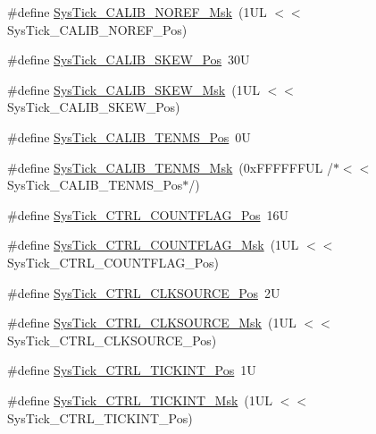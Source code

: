\begin{DoxyCompactItemize}
\item 
\#define \hyperlink{group___c_m_s_i_s___sys_tick_ga3af0d891fdd99bcc8d8912d37830edb6}{Sys\+Tick\+\_\+\+C\+A\+L\+I\+B\+\_\+\+N\+O\+R\+E\+F\+\_\+\+Msk}~(1\+U\+L $<$$<$ Sys\+Tick\+\_\+\+C\+A\+L\+I\+B\+\_\+\+N\+O\+R\+E\+F\+\_\+\+Pos)
\item 
\#define \hyperlink{group___c_m_s_i_s___sys_tick_gadd0c9cd6641b9f6a0c618e7982954860}{Sys\+Tick\+\_\+\+C\+A\+L\+I\+B\+\_\+\+S\+K\+E\+W\+\_\+\+Pos}~30U
\item 
\#define \hyperlink{group___c_m_s_i_s___sys_tick_ga8a6a85a87334776f33d77fd147587431}{Sys\+Tick\+\_\+\+C\+A\+L\+I\+B\+\_\+\+S\+K\+E\+W\+\_\+\+Msk}~(1\+U\+L $<$$<$ Sys\+Tick\+\_\+\+C\+A\+L\+I\+B\+\_\+\+S\+K\+E\+W\+\_\+\+Pos)
\item 
\#define \hyperlink{group___c_m_s_i_s___sys_tick_gacae558f6e75a0bed5d826f606d8e695e}{Sys\+Tick\+\_\+\+C\+A\+L\+I\+B\+\_\+\+T\+E\+N\+M\+S\+\_\+\+Pos}~0U
\item 
\#define \hyperlink{group___c_m_s_i_s___sys_tick_gaf1e68865c5aece2ad58971225bd3e95e}{Sys\+Tick\+\_\+\+C\+A\+L\+I\+B\+\_\+\+T\+E\+N\+M\+S\+\_\+\+Msk}~(0x\+F\+F\+F\+F\+F\+F\+U\+L /$\ast$$<$$<$ Sys\+Tick\+\_\+\+C\+A\+L\+I\+B\+\_\+\+T\+E\+N\+M\+S\+\_\+\+Pos$\ast$/)
\item 
\#define \hyperlink{group___c_m_s_i_s___sys_tick_gadbb65d4a815759649db41df216ed4d60}{Sys\+Tick\+\_\+\+C\+T\+R\+L\+\_\+\+C\+O\+U\+N\+T\+F\+L\+A\+G\+\_\+\+Pos}~16U
\item 
\#define \hyperlink{group___c_m_s_i_s___sys_tick_ga1bf3033ecccf200f59baefe15dbb367c}{Sys\+Tick\+\_\+\+C\+T\+R\+L\+\_\+\+C\+O\+U\+N\+T\+F\+L\+A\+G\+\_\+\+Msk}~(1\+U\+L $<$$<$ Sys\+Tick\+\_\+\+C\+T\+R\+L\+\_\+\+C\+O\+U\+N\+T\+F\+L\+A\+G\+\_\+\+Pos)
\item 
\#define \hyperlink{group___c_m_s_i_s___sys_tick_ga24fbc69a5f0b78d67fda2300257baff1}{Sys\+Tick\+\_\+\+C\+T\+R\+L\+\_\+\+C\+L\+K\+S\+O\+U\+R\+C\+E\+\_\+\+Pos}~2U
\item 
\#define \hyperlink{group___c_m_s_i_s___sys_tick_gaa41d06039797423a46596bd313d57373}{Sys\+Tick\+\_\+\+C\+T\+R\+L\+\_\+\+C\+L\+K\+S\+O\+U\+R\+C\+E\+\_\+\+Msk}~(1\+U\+L $<$$<$ Sys\+Tick\+\_\+\+C\+T\+R\+L\+\_\+\+C\+L\+K\+S\+O\+U\+R\+C\+E\+\_\+\+Pos)
\item 
\#define \hyperlink{group___c_m_s_i_s___sys_tick_ga88f45bbb89ce8df3cd2b2613c7b48214}{Sys\+Tick\+\_\+\+C\+T\+R\+L\+\_\+\+T\+I\+C\+K\+I\+N\+T\+\_\+\+Pos}~1U
\item 
\#define \hyperlink{group___c_m_s_i_s___sys_tick_ga95bb984266ca764024836a870238a027}{Sys\+Tick\+\_\+\+C\+T\+R\+L\+\_\+\+T\+I\+C\+K\+I\+N\+T\+\_\+\+Msk}~(1\+U\+L $<$$<$ Sys\+Tick\+\_\+\+C\+T\+R\+L\+\_\+\+T\+I\+C\+K\+I\+N\+T\+\_\+\+Pos)
$$
\end{DoxyCompactItemize}

